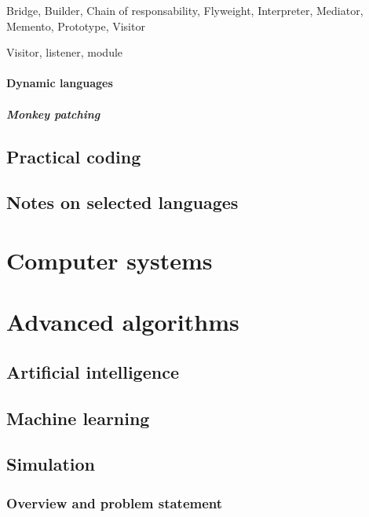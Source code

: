 \documentclass{report}
\begin{document}
Bridge, Builder, Chain of responsability, Flyweight, Interpreter, Mediator, Memento, Prototype, Visitor

Visitor, listener, module
\subsection{Dynamic languages}
\subsubsection{Monkey patching}

\chapter{Practical coding}


\chapter{Notes on selected languages}


\part{Computer systems}
\setcounter{chapter}{0} %


\part{Advanced algorithms}
\setcounter{chapter}{0} %
\chapter{Artificial intelligence}
\chapter{Machine learning}

\chapter{Simulation}
\section{Overview and problem statement}
\end{document}
